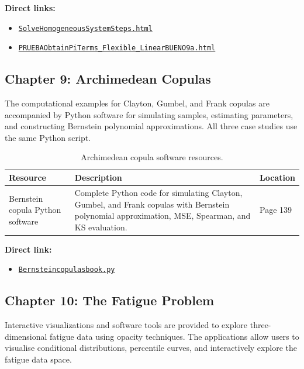 \noindent
\textbf{Direct links:}
\begin{itemize}
    \item \href{https://enriquecastilloron.github.io/mi-libro-interactivo/apps/SolveHomogeneousSystemSteps.html}{\nolinkurl{SolveHomogeneousSystemSteps.html}}
    \item \href{https://enriquecastilloron.github.io/mi-libro-interactivo/apps/PRUEBAObtainPiTerms_Flexible_LinearBUENO9a.html}{\nolinkurl{PRUEBAObtainPiTerms_Flexible_LinearBUENO9a.html}}
\end{itemize}

\subsection{Chapter 9: Archimedean Copulas}

The computational examples for Clayton, Gumbel, and Frank copulas are accompanied by Python software for simulating samples, estimating parameters, and constructing Bernstein polynomial approximations. All three case studies use the same Python script.

\begin{table}[H]
\centering
\caption{Archimedean copula software resources.}
\begin{tabular}{p{3cm}p{8cm}p{3cm}}
\toprule
\textbf{Resource} & \textbf{Description} & \textbf{Location} \\
\midrule
Bernstein copula Python software & Complete Python code for simulating Clayton, Gumbel, and Frank copulas with Bernstein polynomial approximation, MSE, Spearman, and KS evaluation. & Page 139 \\
\bottomrule
\end{tabular}
\end{table}

\noindent
\textbf{Direct link:}
\begin{itemize}
    \item \href{https://github.com/enriquecastilloron-coder/PRUEBA/raw/refs/heads/main/Bernsteincopulasbook.py}{\nolinkurl{Bernsteincopulasbook.py}}
\end{itemize}

\subsection{Chapter 10: The Fatigue Problem}

Interactive visualizations and software tools are provided to explore three-dimensional fatigue data using opacity techniques. The applications allow users to visualise conditional distributions, percentile curves, and interactively explore the fatigue data space.


